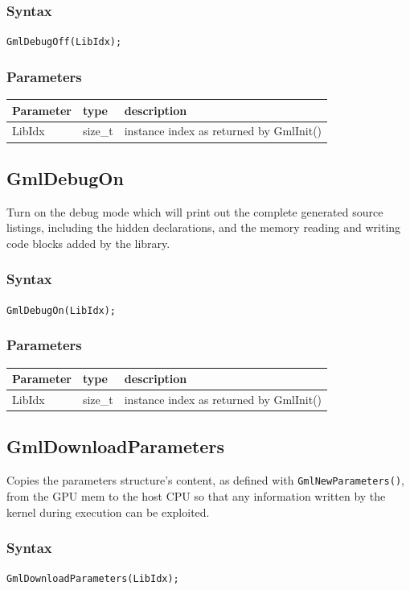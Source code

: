 \documentclass[a4paper,12pt]{article}
\begin{document}
\subsubsection*{Syntax}
{\tt GmlDebugOff(LibIdx);}

\subsubsection*{Parameters}

\begin{tabular}{|m{2cm}|m{1.5cm}|m{10.5cm}|}
\hline
Parameter  & type    & description \\
\hline
LibIdx     & size\_t & instance index as returned by GmlInit() \\
\hline
\end{tabular}


\subsection{GmlDebugOn}
Turn on the debug mode which will print out the complete generated source listings, including the hidden declarations, and the memory reading and writing code blocks added by the library.

\subsubsection*{Syntax}
{\tt GmlDebugOn(LibIdx);}

\subsubsection*{Parameters}
\begin{tabular}{|m{2cm}|m{1.5cm}|m{10.5cm}|}
\hline
Parameter  & type    & description \\
\hline
LibIdx     & size\_t & instance index as returned by GmlInit() \\
\hline
\end{tabular}


\subsection{GmlDownloadParameters}
Copies the parameters structure's content, as defined with  {\tt GmlNewParameters()}, from the GPU mem to the host CPU so that any information written by the kernel during execution can be exploited.

\subsubsection*{Syntax}
{\tt GmlDownloadParameters(LibIdx);}
\end{document}
